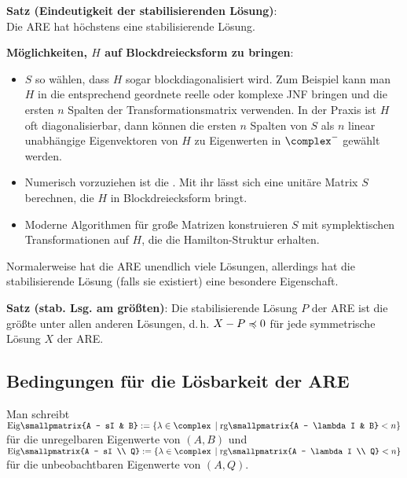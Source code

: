 \textbf{Satz (Eindeutigkeit der stabilisierenden Lösung)}:\\
Die ARE hat höchstens eine stabilisierende Lösung.

\linie

\textbf{Möglichkeiten, $H$ auf Blockdreiecksform zu bringen}:
\begin{itemize}
    \item
    $S$ so wählen, dass $H$ sogar blockdiagonalisiert wird.
    Zum Beispiel kann man $H$ in die entsprechend geordnete reelle oder komplexe JNF bringen
    und die ersten $n$ Spalten der Transformationsmatrix verwenden.
    In der Praxis ist $H$ oft diagonalisierbar,
    dann können die ersten $n$
    Spalten von $S$ als $n$ linear unabhängige Eigenvektoren von $H$
    zu Eigenwerten in $\complex^-$ gewählt werden.
    
    \item
    Numerisch vorzuziehen ist die .
    Mit ihr lässt sich eine unitäre Matrix $S$ berechnen, die $H$ in Blockdreiecksform bringt.
    
    \item
    Moderne Algorithmen für große Matrizen konstruieren $S$ mit symplektischen Transformationen
    auf $H$, die die Hamilton-Struktur erhalten.
\end{itemize}

\linie

Normalerweise hat die ARE unendlich viele Lösungen, allerdings hat die stabilisierende Lösung
(falls sie existiert) eine besondere Eigenschaft.

\textbf{Satz (stab. Lsg. am größten)}:
Die stabilisierende Lösung $P$ der ARE ist die größte unter allen anderen Lösungen,
d.\,h. $X - P \preccurlyeq 0$ für jede symmetrische Lösung $X$ der ARE.

\pagebreak

\subsection{%
    Bedingungen für die Lösbarkeit der ARE%
}

Man schreibt $\Eig\!\smallpmatrix{A - sI & B} := \{\lambda \in \complex \;\left|\;
\rg\!\smallpmatrix{A - \lambda I & B} < n\right\}$ für die
unregelbaren Eigenwerte von $(A, B)$ und
$\Eig\!\smallpmatrix{A - sI \\ Q} := \{\lambda \in \complex \;\left|\;
\rg\!\smallpmatrix{A - \lambda I \\ Q} < n\right\}$ für die
unbeobachtbaren Eigenwerte von $(A, Q)$.

